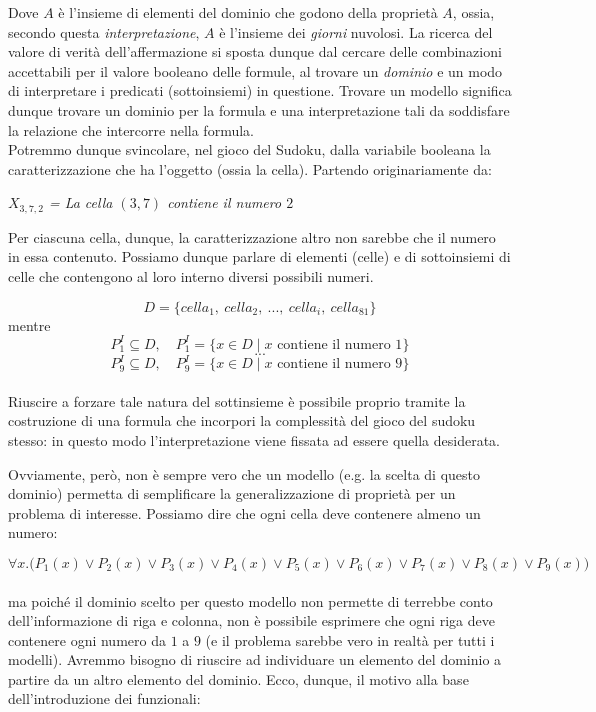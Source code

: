 \documentclass[a4paper,10pt]{article}
\begin{document}
Dove $A$ è l'insieme di elementi del dominio che godono della proprietà $A$, ossia, secondo questa \textit{interpretazione}, $A$ è l'insieme dei \textit{giorni} nuvolosi. La ricerca del valore di verità dell'affermazione si sposta dunque dal cercare delle combinazioni accettabili per il valore booleano delle formule, al trovare un \textit{dominio} e un modo di interpretare i predicati (sottoinsiemi) in questione. Trovare un modello significa dunque trovare un dominio per la formula e una interpretazione tali da soddisfare la relazione che intercorre nella formula.\\

Potremmo dunque svincolare, nel gioco del Sudoku, dalla variabile booleana la caratterizzazione che ha l'oggetto (ossia la cella). Partendo originariamente da:
\begin{center}
\textit{$X_{3,7,2}$ = La cella $(3,7)$ contiene il numero $2$}
\end{center}
Per ciascuna cella, dunque, la caratterizzazione altro non sarebbe che il numero in essa contenuto. Possiamo dunque parlare di elementi (celle) e di sottoinsiemi di celle che contengono al loro interno diversi possibili numeri.

$$D=\{cella_1,\ cella_2,\ ...,\ cella_i,\ cella_{81}\}$$
mentre 
$$P_1^I\subseteq D,\quad P^I_1=\{x\in D\mid x \text{ contiene il numero 1}\}$$
$$...$$
$$P_9^I\subseteq D,\quad P^I_9=\{x\in D\mid x \text{ contiene il numero 9}\}$$\\
Riuscire a forzare tale natura del sottinsieme è possibile proprio tramite la costruzione di una formula che incorpori la complessità del gioco del sudoku stesso: in questo modo l'interpretazione viene fissata ad essere quella desiderata.

Ovviamente, però, non è sempre vero che un modello (e.g. la scelta di questo dominio) permetta di semplificare la generalizzazione di proprietà per un problema di interesse. Possiamo dire che ogni cella deve contenere almeno un numero:

$$\forall x.\bigg(P_1(x)\lor P_2(x)\lor P_3(x)\lor P_4(x)\lor P_5(x)\lor P_6(x)\lor P_7(x)\lor P_8(x)\lor P_9(x)\bigg)$$\\
ma poiché il dominio scelto per questo modello non permette di terrebbe conto dell'informazione di riga e colonna, non è possibile esprimere che ogni riga deve contenere ogni numero da $1$ a $9$ (e il problema sarebbe vero in realtà per tutti i modelli). Avremmo bisogno di riuscire ad individuare un elemento del dominio a partire da un altro elemento del dominio. Ecco, dunque, il motivo alla base dell'introduzione dei funzionali:
\end{document}
